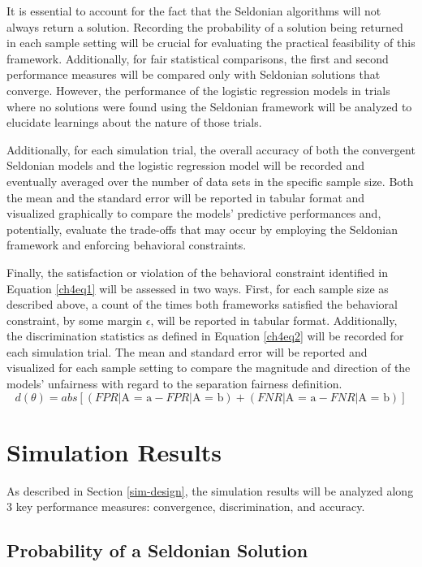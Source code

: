 \documentclass[12pt, twoside]{amherstthesis}
\begin{document}
It is essential to account for the fact that the Seldonian algorithms will not always return a solution. Recording the probability of a solution being returned in each sample setting will be crucial for evaluating the practical feasibility of this framework. Additionally, for fair statistical comparisons, the first and second performance measures will be compared only with Seldonian solutions that converge. However, the performance of the logistic regression models in trials where no solutions were found using the Seldonian framework will be analyzed to elucidate learnings about the nature of those trials.

Additionally, for each simulation trial, the overall accuracy of both the convergent Seldonian models and the logistic regression model will be recorded and eventually averaged over the number of data sets in the specific sample size. Both the mean and the standard error will be reported in tabular format and visualized graphically to compare the models' predictive performances and, potentially, evaluate the trade-offs that may occur by employing the Seldonian framework and enforcing behavioral constraints.

Finally, the satisfaction or violation of the behavioral constraint identified in Equation \ref{ch4eq1} will be assessed in two ways. First, for each sample size as described above, a count of the times both frameworks satisfied the behavioral constraint, by some margin \(\epsilon\), will be reported in tabular format. Additionally, the discrimination statistics as defined in Equation \ref{ch4eq2} will be recorded for each simulation trial. The mean and standard error will be reported and visualized for each sample setting to compare the magnitude and direction of the models' unfairness with regard to the separation fairness definition.
\begin{equation}
\label{ch4eq2}
d(\theta) = abs[(FPR | \text{A = a} - FPR | \text{A = b}) + (FNR | \text{A = a} - FNR | \text{A = b})]
\end{equation}
\hypertarget{sim-results}{%
\section{Simulation Results}\label{sim-results}}

As described in Section \ref{sim-design}, the simulation results will be analyzed along 3 key performance measures: convergence, discrimination, and accuracy.

\hypertarget{probability-of-a-seldonian-solution}{%
\subsection{Probability of a Seldonian Solution}\label{probability-of-a-seldonian-solution}}
\end{document}
